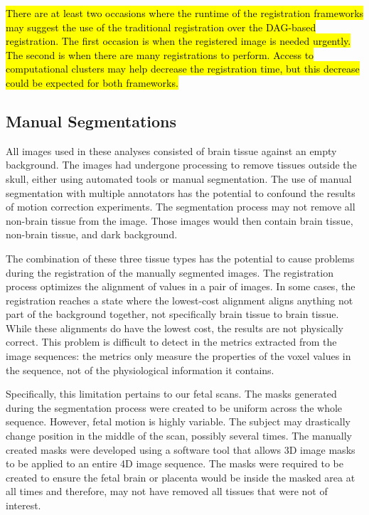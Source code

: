 \hl{There are at least two occasions where the runtime of the registration frameworks may suggest the use of the traditional registration over the DAG-based registration. The first occasion is when the registered image is needed urgently. The second is when there are many registrations to perform. Access to computational clusters may help decrease the registration time, but this decrease could be expected for both frameworks.}

\subsection{Manual Segmentations}

All images used in these analyses consisted of brain tissue against an empty background. The images had undergone processing to remove tissues outside the skull, either using automated tools or manual segmentation. The use of manual segmentation with multiple annotators has the potential to confound the results of motion correction experiments. The segmentation process may not remove all non-brain tissue from the image. Those images would then contain brain tissue, non-brain tissue, and dark background. 

The combination of these three tissue types has the potential to cause problems during the registration of the manually segmented images. The registration process optimizes the alignment of values in a pair of images. In some cases, the registration reaches a state where the lowest-cost alignment aligns anything not part of the background together, not specifically brain tissue to brain tissue. While these alignments do have the lowest cost, the results are not physically correct. This problem is difficult to detect in the metrics extracted from the image sequences: the metrics only measure the properties of the voxel values in the sequence, not of the physiological information it contains. 

Specifically, this limitation pertains to our fetal scans. The masks generated during the segmentation process were created to be uniform across the whole sequence. However, fetal motion is highly variable. The subject may drastically change position in the middle of the scan, possibly several times. The manually created masks were developed using a software tool that allows 3D image masks to be applied to an entire 4D image sequence. The masks were required to be created to ensure the fetal brain or placenta would be inside the masked area at all times and therefore, may not have removed all tissues that were not of interest.

